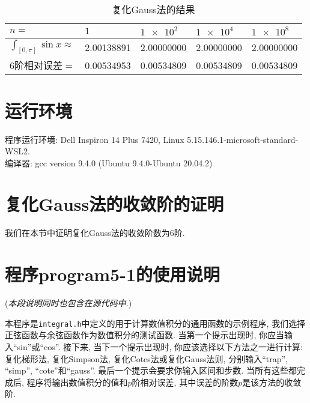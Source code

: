 \documentclass[a4paper]{ctexart}
\theoremstyle{plain}
\begin{document}
\begin{table}[H]
    \centering
    \begin{tabular}{|l|l|l|l|l|}
    \hline
    $n=$ & $1$ & $\num{1e2}$ & $\num{1e4}$ & $\num{1e8}$ \\ \hline
    $\int_{[0,\pi]}\sin{x}\approx$ & 2.00138891 & 2.00000000 & 2.00000000 & 2.00000000 \\ \hline
    $6$阶相对误差$=$ & 0.00534953 & 0.00534809 & 0.00534809 & 0.00534809 \\ \hline
    \end{tabular}
    \caption{复化Gauss法的结果}
\end{table}

\section{运行环境}
\noindent 程序运行环境: Dell Inspiron 14 Plus 7420, Linux 5.15.146.1-microsoft-standard-WSL2.\\
编译器: gcc version 9.4.0 (Ubuntu 9.4.0-Ubuntu 20.04.2)

\appendix

\section{复化Gauss法的收敛阶的证明}\label{gauss}
我们在本节中证明复化Gauss法的收敛阶数为$6$阶.

\section{程序program5-1的使用说明}
(\textit{本段说明同时也包含在源代码中.})

本程序是\verb|integral.h|中定义的用于计算数值积分的通用函数的示例程序, 我们选择正弦函数与余弦函数作为数值积分的测试函数.
当第一个提示出现时, 你应当输入``sin''或``cos''.
接下来, 当下一个提示出现时, 你应该选择以下方法之一进行计算: 复化梯形法, 复化Simpson法, 复化Cotes法或复化Gauss法则, 分别输入``trap'', ``simp'', ``cote''和``gauss''.
最后一个提示会要求你输入区间和步数.
当所有这些都完成后, 程序将输出数值积分的值和$p$阶相对误差, 其中误差的阶数$p$是该方法的收敛阶.
\end{document}
